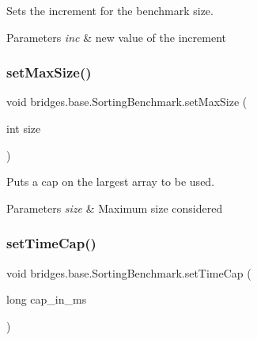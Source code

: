 Sets the increment for the benchmark size. 


\begin{DoxyParams}{Parameters}
{\em inc} & new value of the increment \\
\hline
\end{DoxyParams}
\mbox{\label{classbridges_1_1base_1_1_sorting_benchmark_a7a390c4820afb92d74ef8f023a6cc227}} 
\subsubsection{\texorpdfstring{set\+Max\+Size()}{setMaxSize()}}
{\footnotesize\ttfamily void bridges.\+base.\+Sorting\+Benchmark.\+set\+Max\+Size (\begin{DoxyParamCaption}\item[{int}]{size }\end{DoxyParamCaption})}



Puts a cap on the largest array to be used. 


\begin{DoxyParams}{Parameters}
{\em size} & Maximum size considered \\
\hline
\end{DoxyParams}
\mbox{\label{classbridges_1_1base_1_1_sorting_benchmark_a52b13910224cfafea16f7f3979a77592}} 
\subsubsection{\texorpdfstring{set\+Time\+Cap()}{setTimeCap()}}
{\footnotesize\ttfamily void bridges.\+base.\+Sorting\+Benchmark.\+set\+Time\+Cap (\begin{DoxyParamCaption}\item[{long}]{cap\+\_\+in\+\_\+ms }\end{DoxyParamCaption})}



